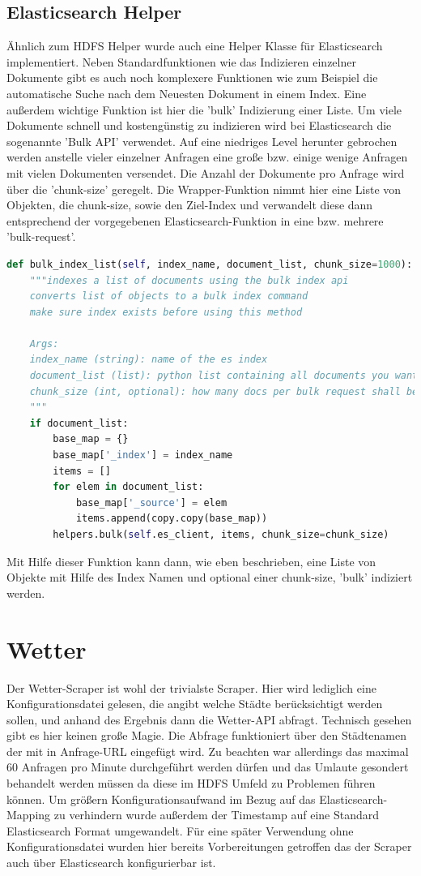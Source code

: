 \documentclass[12pt,oneside,a4paper,parskip]{scrbook}
\begin{document}
\subsection{Elasticsearch Helper}
\"Ahnlich zum HDFS Helper wurde auch eine Helper Klasse f\"ur Elasticsearch implementiert. Neben Standardfunktionen wie das Indizieren einzelner Dokumente gibt es auch noch komplexere Funktionen wie zum Beispiel die automatische Suche nach dem Neuesten Dokument in einem Index. Eine außerdem wichtige Funktion ist hier die 'bulk' Indizierung einer Liste. Um viele Dokumente schnell und kosteng\"unstig zu indizieren wird bei Elasticsearch die sogenannte 'Bulk API' verwendet. Auf eine niedriges Level herunter gebrochen werden anstelle vieler einzelner Anfragen eine große bzw. einige wenige Anfragen mit vielen Dokumenten versendet. Die Anzahl der Dokumente pro Anfrage wird \"uber die 'chunk-size' geregelt. Die Wrapper-Funktion nimmt hier eine Liste von Objekten, die chunk-size, sowie den Ziel-Index und verwandelt diese dann entsprechend der vorgegebenen Elasticsearch-Funktion in eine bzw. mehrere 'bulk-request'.
\begin{lstlisting}[caption=Elasticsearch Helper f\"ur Bulk Indizierung ,label=esBulk,language=python]
	def bulk_index_list(self, index_name, document_list, chunk_size=1000):
	"""indexes a list of documents using the bulk index api
	converts list of objects to a bulk index command
	make sure index exists before using this method

	Args:
	index_name (string): name of the es index
	document_list (list): python list containing all documents you want to index
	chunk_size (int, optional): how many docs per bulk request shall be added to the request. Defaults to 10000.
	"""
	if document_list:
		base_map = {}
		base_map['_index'] = index_name
		items = []
		for elem in document_list:
			base_map['_source'] = elem
			items.append(copy.copy(base_map))
		helpers.bulk(self.es_client, items, chunk_size=chunk_size)
\end{lstlisting}
Mit Hilfe dieser Funktion kann dann, wie eben beschrieben, eine Liste von Objekte mit Hilfe des Index Namen und optional einer chunk-size, 'bulk' indiziert werden.
\section{Wetter}
Der Wetter-Scraper ist wohl der trivialste Scraper. Hier wird lediglich eine Konfigurationsdatei gelesen, die angibt welche St\"adte ber\"ucksichtigt werden sollen, und anhand des Ergebnis dann die Wetter-API abfragt. Technisch gesehen gibt es hier keinen große Magie. Die Abfrage funktioniert \"uber den Städtenamen der mit in Anfrage-URL eingef\"ugt wird. Zu beachten war allerdings das maximal 60 Anfragen pro Minute durchgef\"uhrt werden d\"urfen und das Umlaute gesondert behandelt werden m\"ussen da diese im HDFS Umfeld zu Problemen f\"uhren k\"onnen. Um gr\"oßern Konfigurationsaufwand im Bezug auf das Elasticsearch-Mapping zu verhindern wurde außerdem der Timestamp auf eine Standard Elasticsearch Format umgewandelt.\newline
F\"ur eine sp\"ater Verwendung ohne Konfigurationsdatei wurden hier bereits Vorbereitungen getroffen das der Scraper auch \"uber Elasticsearch konfigurierbar ist.
\end{document}
